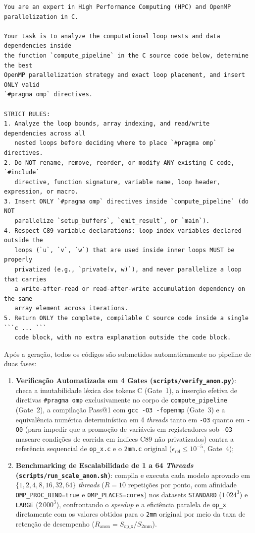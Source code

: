 \begin{lstlisting}[basicstyle=\scriptsize\ttfamily, breaklines=true, frame=single, label=cod:anon_prompt, caption={Prompt neutro (\texttt{prompts/AnonPrompt.md}) empregado na anotação do método anonimizado}]
You are an expert in High Performance Computing (HPC) and OpenMP parallelization in C.

Your task is to analyze the computational loop nests and data dependencies inside
the function `compute_pipeline` in the C source code below, determine the best
OpenMP parallelization strategy and exact loop placement, and insert ONLY valid
`#pragma omp` directives.

STRICT RULES:
1. Analyze the loop bounds, array indexing, and read/write dependencies across all
   nested loops before deciding where to place `#pragma omp` directives.
2. Do NOT rename, remove, reorder, or modify ANY existing C code, `#include`
   directive, function signature, variable name, loop header, expression, or macro.
3. Insert ONLY `#pragma omp` directives inside `compute_pipeline` (do NOT
   parallelize `setup_buffers`, `emit_result`, or `main`).
4. Respect C89 variable declarations: loop index variables declared outside the
   loops (`u`, `v`, `w`) that are used inside inner loops MUST be properly
   privatized (e.g., `private(v, w)`), and never parallelize a loop that carries
   a write-after-read or read-after-write accumulation dependency on the same
   array element across iterations.
5. Return ONLY the complete, compilable C source code inside a single ```c ... ```
   code block, with no extra explanation outside the code block.
\end{lstlisting}

Após a geração, todos os códigos são submetidos automaticamente ao pipeline de duas fases:
\begin{enumerate}
    \item \textbf{Verificação Automatizada em 4 Gates (\texttt{scripts/verify\_anon.py})}: checa a imutabilidade léxica dos tokens C (Gate~1), a inserção efetiva de diretivas \texttt{\#pragma omp} exclusivamente no corpo de \texttt{compute\_pipeline} (Gate~2), a compilação Pass@1 com \texttt{gcc -O3 -fopenmp} (Gate~3) e a equivalência numérica determinística em 4 \textit{threads} tanto em \texttt{-O3} quanto em \texttt{-O0} (para impedir que a promoção de variáveis em registradores sob \texttt{-O3} mascare condições de corrida em índices C89 não privatizados) contra a referência sequencial de \texttt{op\_x.c} e o \texttt{2mm.c} original ($\epsilon_{\text{rel}} \le 10^{-5}$, Gate~4);
    \item \textbf{Benchmarking de Escalabilidade de 1 a 64 \textit{Threads} (\texttt{scripts/run\_scale\_anon.sh})}: compila e executa cada modelo aprovado em $\{1, 2, 4, 8, 16, 32, 64\}$ \textit{threads} ($R = 10$ repetições por ponto, com afinidade \texttt{OMP\_PROC\_BIND=true} e \texttt{OMP\_PLACES=cores}) nos datasets \texttt{STANDARD} ($1\,024^3$) e \texttt{LARGE} ($2\,000^3$), confrontando o \textit{speedup} e a eficiência paralela de \texttt{op\_x} diretamente com os valores obtidos para o \texttt{2mm} original por meio da taxa de retenção de desempenho ($R_{\text{anon}} = S_{\text{op\_x}} / S_{\text{2mm}}$).
\end{enumerate}

